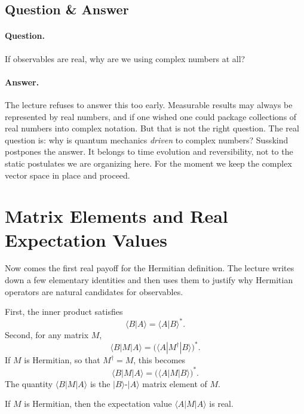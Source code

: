\subsection{Question \& Answer}

\paragraph{Question.} If observables are real, why are we using complex numbers at all?

\paragraph{Answer.} The lecture refuses to answer this too early. Measurable results may always be represented by real numbers, and if one wished one could package collections of real numbers into complex notation. But that is not the right question. The real question is: why is quantum mechanics \emph{driven} to complex numbers? Susskind postpones the answer. It belongs to time evolution and reversibility, not to the static postulates we are organizing here. For the moment we keep the complex vector space in place and proceed.

\section{Matrix Elements and Real Expectation Values}

Now comes the first real payoff for the Hermitian definition. The lecture writes down a few elementary identities and then uses them to justify why Hermitian operators are natural candidates for observables.

First, the inner product satisfies
\begin{equation}
\langle B|A\rangle=\langle A|B\rangle^*.
\end{equation}
Second, for any matrix \(M\),
\begin{equation}
\langle B|M|A\rangle=\bigl(\langle A|M^\dagger|B\rangle\bigr)^*.
\end{equation}
If \(M\) is Hermitian, so that \(M^\dagger=M\), this becomes
\begin{equation}
\langle B|M|A\rangle=\bigl(\langle A|M|B\rangle\bigr)^*.
\end{equation}
The quantity \(\langle B|M|A\rangle\) is the \(|B\rangle\)-\(|A\rangle\) matrix element of \(M\).

\begin{proposition}
If \(M\) is Hermitian, then the expectation value \(\langle A|M|A\rangle\) is real.
\end{proposition}

